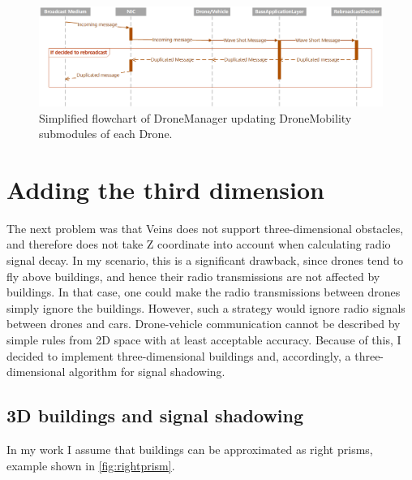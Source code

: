 \documentclass[]{nsm-thesis}
\begin{document}
\begin{figure}
	\centering
	\includegraphics[width=1\textwidth]{figures/RebroadcastDecider.png}
	\caption{Simplified flowchart of DroneManager updating DroneMobility submodules of each Drone.}
	\label{fig:rebroadcastdeciderseq}
\end{figure}

\section{Adding the third dimension}

The next problem was that Veins does not support three-dimensional obstacles, and therefore does not take Z coordinate into account when calculating radio signal decay. In my scenario, this is a significant drawback, since drones tend to fly above buildings, and hence their radio transmissions are not affected by buildings. In that case, one could make the radio transmissions between drones simply ignore the buildings. However, such a strategy would ignore radio signals between drones and cars. Drone-vehicle communication cannot be described by simple rules from 2D space with at least acceptable accuracy. Because of this, I decided to implement three-dimensional buildings and, accordingly, a three-dimensional algorithm for signal shadowing.

\subsection{3D buildings and signal shadowing}

In my work I assume that buildings can be approximated as right prisms, example shown in \cref{fig:rightprism}. 
\end{document}
